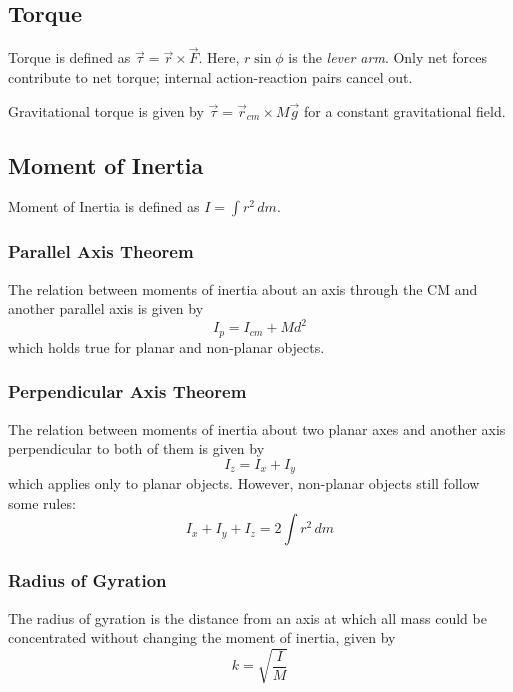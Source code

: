 \documentclass[../PhysicsFormulae.tex]{subfiles}
\begin{document}
\subsection{Torque}
Torque is defined as $ \vec{\tau} = \vec{r} \times \vec{F} $. Here, $r\sin{\phi}$ is the \textit{lever arm}. Only net forces contribute to net torque; internal action-reaction pairs cancel out. \bigskip

Gravitational torque is given by $\vec{\tau} = \vec{r}_{cm} \times M \vec{g}$ for a constant gravitational field.

\subsection{Moment of Inertia}
Moment of Inertia is defined as $I = \int r^2 \,dm$.

\subsubsection{Parallel Axis Theorem}
The relation between moments of inertia about an axis through the CM and another parallel axis is given by 
\[I_p = I_{cm} + Md^2\]
which holds true for planar and non-planar objects.

\subsubsection{Perpendicular Axis Theorem}
The relation between moments of inertia about two planar axes and another axis perpendicular to both of them is given by
\[I_z = I_x + I_y\]
which applies only to planar objects. However, non-planar objects still follow some rules:
\[I_x + I_y + I_z = 2 \int r^2 \,dm\]

\subsubsection{Radius of Gyration}
The radius of gyration is the distance from an axis at which all mass could be concentrated without changing the moment of inertia, given by
\[k = \sqrt{\frac{I}{M}}\]
\end{document}
